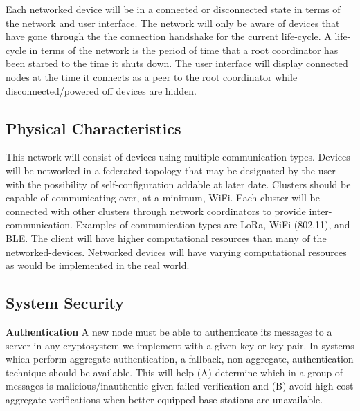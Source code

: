 \documentclass[tikz,a4paper,titlepage]{article}
\begin{document}
Each networked device will be in a connected or disconnected state in terms of the network and user interface. The network will only be aware of devices that have gone through the the connection handshake for the current life-cycle. A life-cycle in terms of the network is the period of time that a root coordinator has been started to the time it shuts down. The user interface will display connected nodes at the time it connects as a peer to the root coordinator while disconnected/powered off devices are hidden.

\subsection{Physical Characteristics} %

This network will consist of devices using multiple communication types. Devices will be networked in a federated topology that may be designated by the user with the possibility of self-configuration addable at later date. Clusters should be capable of communicating over, at a minimum, WiFi. Each cluster will be connected with other clusters through network coordinators to provide inter-communication. Examples of communication types are LoRa, WiFi (802.11), and BLE. The client will have higher computational resources than many of the networked-devices. Networked devices will have varying computational resources as would be implemented in the real world. 

\subsection{System Security} %

    
\textbf{Authentication}
A new node must be able to authenticate its messages to a server in any cryptosystem we implement with a given key or key pair. In systems which perform aggregate authentication, a fallback, non-aggregate, authentication technique should be available. This will help (A) determine which in a group of messages is malicious/inauthentic given failed verification and (B) avoid high-cost aggregate verifications when better-equipped base stations are unavailable.
    
\end{document}
